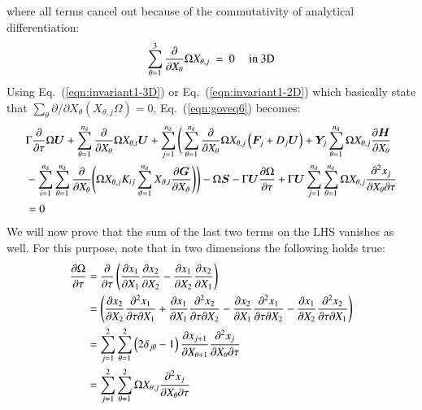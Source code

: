\documentclass{warpdoc}
\newcommand{\alb}{\vspace{0.2cm}\\} %
\newcommand{\nd}{{{n}_{\rm d}}}
\newcommand{\mfd}{\displaystyle}
\renewcommand{\vec}[1]{\bm{#1}}
\begin{document}
%
where all terms cancel out because of the commutativity
of analytical differentiation:
%
\begin{equation}
  \sum_{\theta=1}^3   \frac{\partial}{\partial X_\theta}\Omega X_{\theta,j} 
  ~=~0 {\rm ~~~~~in~3D}
  \label{eqn:invariant1-3D}
\end{equation}
%
Using Eq.\ (\ref{eqn:invariant1-3D}) or Eq.\ 
(\ref{eqn:invariant1-2D}) which basically state that
$\sum_\theta \partial/\partial X_{\theta} ( X_{\theta,j} \Omega)=0$,
Eq.\  (\ref{eqn:goveq6}) becomes:
%
\begin{align}
    \mfd&\Gamma \frac{\partial }{\partial \tau} \Omega\vec{U}
     + \sum_{\theta=1}^\nd  \frac{\partial }{\partial X_\theta} \Omega X_{\theta,t} \vec{U}
    + \sum_{j=1}^\nd \Bigg( \sum_{\theta=1}^\nd \frac{\partial}{\partial X_\theta} \Omega X_{\theta,j} \left(\vec{F}_j+D_j \vec{U}\right)+\vec{Y}_j  \sum_{\theta=1}^\nd \Omega X_{\theta,j}\frac{\partial \vec{H}}{\partial X_\theta}
     \nonumber\alb
    &- \sum_{i=1}^\nd \sum_{\theta=1}^\nd   \frac{\partial}{\partial X_\theta}
       \Bigg( \Omega X_{\theta,j} K_{ij} \sum_{\vartheta=1}^\nd X_{\vartheta,i}\frac{\partial \vec{G}}{\partial X_\vartheta} \Bigg)\Bigg)
    - \Omega\vec{S} 
    -\Gamma \vec{U} \frac{\partial \Omega}{\partial \tau} 
+ \Gamma \vec{U} \mfd\sum_{j=1}^\nd \sum_{\theta=1}^\nd \Omega{X_{\theta,j}} \frac{\partial^2 x_j}{\partial X_\theta \partial \tau} \nonumber\alb
   &=0
 \label{eqn:goveq7}
\end{align}
%
We will now prove that the sum of the
last two terms on the LHS vanishes as well. For this purpose, note that in two dimensions the following holds true:
%
\begin{align}
   \frac{\partial \Omega}{\partial \tau}
  &=\frac{\partial}{\partial \tau}
   \left(
       \frac{\partial x_1}{\partial X_1} \frac{\partial x_2}{\partial X_2}
      -\frac{\partial x_1}{\partial X_2} \frac{\partial x_2}{\partial X_1}
   \right)\alb\mfd
  &=\left(
       \frac{\partial x_2}{\partial X_2} \frac{\partial^2 x_1}{\partial \tau \partial X_1}
      +\frac{\partial x_1}{\partial X_1} \frac{\partial^2 x_2}{\partial \tau \partial X_2}
      -\frac{\partial x_2}{\partial X_1} \frac{\partial^2 x_1}{\partial \tau \partial X_2}
      -\frac{\partial x_1}{\partial X_2} \frac{\partial^2 x_2}{\partial \tau \partial X_1}
   \right)\alb\mfd
  &= \sum_{j=1}^2 \sum_{\theta=1}^{2} \left(2\delta_{j \theta}-1\right)
     \frac{\partial x_{j+1}}{\partial X_{\theta+1}}\frac{\partial^2 x_j}{\partial X_\theta \partial \tau}\alb\mfd
  &= \sum_{j=1}^2 \sum_{\theta=1}^{2} \Omega X_{\theta,j}
     \frac{\partial^2 x_j}{\partial X_\theta \partial \tau}
\end{align}
\end{document}
